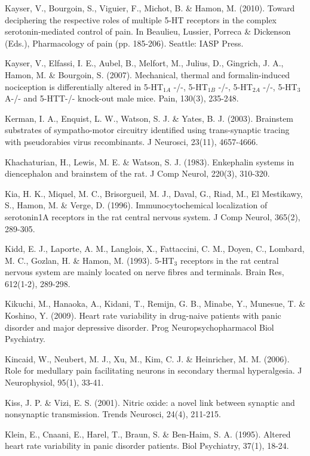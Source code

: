 \documentclass[a4paper,12pt,twoside]{report}
\begin{document}
\begin{singlespacing}
\begin{footnotesize}
Kayser, V., Bourgoin, S., Viguier, F., Michot, B. \& Hamon, M. (2010). Toward deciphering the respective roles of multiple 5-HT receptors in the complex serotonin-mediated control of pain. In Beaulieu, Lussier, Porreca \& Dickenson (Eds.), Pharmacology of pain (pp. 185-206). Seattle: IASP Press.

Kayser, V., Elfassi, I. E., Aubel, B., Melfort, M., Julius, D., Gingrich, J. A., Hamon, M. \& Bourgoin, S. (2007). Mechanical, thermal and formalin-induced nociception is differentially altered in 5-HT$_{1A}$ -/-, 5-HT$_{1B}$ -/-, 5-HT$_{2A}$ -/-, 5-HT$_{3}$ A-/- and 5-HTT-/- knock-out male mice. Pain, 130(3), 235-248.

Kerman, I. A., Enquist, L. W., Watson, S. J. \& Yates, B. J. (2003). Brainstem substrates of sympatho-motor circuitry identified using trans-synaptic tracing with pseudorabies virus recombinants. J Neurosci, 23(11), 4657-4666.

Khachaturian, H., Lewis, M. E. \& Watson, S. J. (1983). Enkephalin systems in diencephalon and brainstem of the rat. J Comp Neurol, 220(3), 310-320.

Kia, H. K., Miquel, M. C., Brisorgueil, M. J., Daval, G., Riad, M., El Mestikawy, S., Hamon, M. \& Verge, D. (1996). Immunocytochemical localization of serotonin1A receptors in the rat central nervous system. J Comp Neurol, 365(2), 289-305.

Kidd, E. J., Laporte, A. M., Langlois, X., Fattaccini, C. M., Doyen, C., Lombard, M. C., Gozlan, H. \& Hamon, M. (1993). 5-HT$_{3}$ receptors in the rat central nervous system are mainly located on nerve fibres and terminals. Brain Res, 612(1-2), 289-298.

Kikuchi, M., Hanaoka, A., Kidani, T., Remijn, G. B., Minabe, Y., Munesue, T. \& Koshino, Y. (2009). Heart rate variability in drug-naive patients with panic disorder and major depressive disorder. Prog Neuropsychopharmacol Biol Psychiatry.

Kincaid, W., Neubert, M. J., Xu, M., Kim, C. J. \& Heinricher, M. M. (2006). Role for medullary pain facilitating neurons in secondary thermal hyperalgesia. J Neurophysiol, 95(1), 33-41.

Kiss, J. P. \& Vizi, E. S. (2001). Nitric oxide: a novel link between synaptic and nonsynaptic transmission. Trends Neurosci, 24(4), 211-215.

Klein, E., Cnaani, E., Harel, T., Braun, S. \& Ben-Haim, S. A. (1995). Altered heart rate variability in panic disorder patients. Biol Psychiatry, 37(1), 18-24.


\end{footnotesize}
\end{singlespacing}
\end{document}
